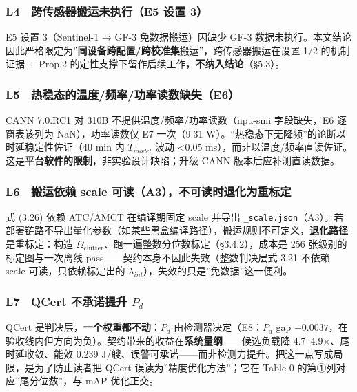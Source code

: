 \subsubsection{L4　跨传感器搬运未执行（E5 设置
3）}\label{l4-ux8de8ux4f20ux611fux5668ux642cux8fd0ux672aux6267ux884ce5-ux8bbeux7f6e-3}

E5 设置 3（Sentinel-1 → GF-3 免数据搬运）因缺少 GF-3
数据未执行。本文结论因此严格限定为''\textbf{同设备跨配置/跨校准集}搬运''，跨传感器搬运在设置
1/2 的机制证据 + Prop.2
的定性支撑下留作后续工作，\textbf{不纳入结论}（§5.3）。

\subsubsection{L5　热稳态的温度/频率/功率读数缺失（E6）}\label{l5-ux70edux7a33ux6001ux7684ux6e29ux5ea6ux9891ux7387ux529fux7387ux8bfbux6570ux7f3aux5931e6}

CANN 7.0.RC1 对 310B 不提供温度/频率/功率读数（npu-smi 字段缺失，E6
逐窗表该列为 NaN），功率读数仅 E7 一次（9.31
W）。``热稳态下无降频''的论断以时延稳定性佐证（40 min 内 \(T_{model}\)
波动 \textless0.05
ms），而非以温度/频率直读佐证。这是\textbf{平台软件的限制}，非实验设计缺陷；升级
CANN 版本后应补测直读数据。

\subsubsection{L6　搬运依赖 scale
可读（A3），不可读时退化为重标定}\label{l6-ux642cux8fd0ux4f9dux8d56-scale-ux53efux8bfba3ux4e0dux53efux8bfbux65f6ux9000ux5316ux4e3aux91cdux6807ux5b9a}

式 (3.26) 依赖 ATC/AMCT 在编译期固定 scale 并导出
\texttt{\_scale.json}（A3）。若部署链路不导出量化参数（如某些黑盒编译路径），搬运规则不可定义，\textbf{退化路径}是重标定：构造
\(\Omega_{\mathrm{clutter}}\)、跑一遍整数分位数标定（§3.4.2），成本是
256 张级别的标定图与一次离线 pass------契约本身不因此失效（整数判决层式
3.21 不依赖 scale 可读，只依赖标定出的
\(\lambda_{int}\)），失效的只是''免数据''这一便利。

\subsubsection{\texorpdfstring{L7　QCert 不承诺提升
\(P_d\)}{L7　QCert 不承诺提升 P\_d}}\label{l7-qcert-ux4e0dux627fux8bfaux63d0ux5347-p_d}

QCert 是判决层，\textbf{一个权重都不动}：\(P_d\)
由检测器决定（E8：\(P_d\) gap
\(-0.0037\)，在验收线内但方向为负）。契约带来的收益在\textbf{系统量纲}------候选负载降
4.7--4.9×、尾时延收敛、能效 0.239
J/艘、误警可承诺------而非检测力提升。把这一点写成局限，是为了防止读者把
QCert 误读为''精度优化方法''；它在 Table 0 的第①列对应''尾分位数''，与
mAP 优化正交。

